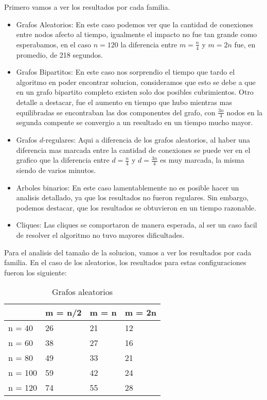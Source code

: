 \newpage
Primero vamos a ver los resultados por cada familia.

\begin{itemize}
	\item Grafos Aleatorios: En este caso podemos ver que la cantidad de conexiones entre nodos afecto al tiempo, igualmente el impacto no fue tan grande como esperabamos, en el caso $n = 120$ la diferencia entre $m = \frac{n}{4}$ y $m = 2n$ fue, en promedio, de 218 segundos.
	\item Grafos Bipartitos: En este caso nos sorprendio el tiempo que tardo el algoritmo en poder encontrar solucion, consideramos que esto se debe a que en un grafo bipartito completo existen solo dos posibles cubrimientos. Otro detalle a destacar, fue el aumento en tiempo que hubo mientras mas equilibradas se encontraban las dos componentes del grafo, con $\frac{3n}{4}$ nodos en la segunda compente se convergio a un resultado en un tiempo mucho mayor.
	\item Grafos $d$-regulares: Aqui a diferencia de los grafos aleatorios, al haber una diferencia mas marcada entre la cantidad de conexiones se puede ver en el grafico que la diferencia entre $d = \frac{n}{4}$ y $d = \frac{3n}{4}$ es muy marcada, la misma siendo de varios minutos.
	\item Arboles binarios: En este caso lamentablemente no es posible hacer un analisis detallado, ya que los resultados no fueron regulares. Sin embargo, podemos destacar, que los resultados se obtuvieron en un tiempo razonable.
	\item Cliques: Las cliques se comportaron de manera esperada, al ser un caso facil de resolver el algoritmo no tuvo mayores dificultades.
\end{itemize}

Para el analisis del tamaño de la solucion, vamos a ver los resultados por cada familia. En el caso de los aleatorios, los resultados para estas configuraciones fueron los siguiente:

\begin{table}[H]
\centering
\caption{Grafos aleatorios}
\label{my-label}
\begin{tabular}{|l|lll|}
\hline
        & \multicolumn{1}{l|}{m = n/2} & \multicolumn{1}{l|}{m = n} & m = 2n \\ \hline
n = 40  & 26                           & 21                         & 12     \\ \cline{1-1}
n = 60  & 38                           & 27                         & 16     \\ \cline{1-1}
n = 80  & 49                           & 33                         & 21     \\ \cline{1-1}
n = 100 & 59                           & 42                         & 24     \\ \cline{1-1}
n = 120 & 74                           & 55                         & 28     \\ \hline
\end{tabular}
\end{table}

